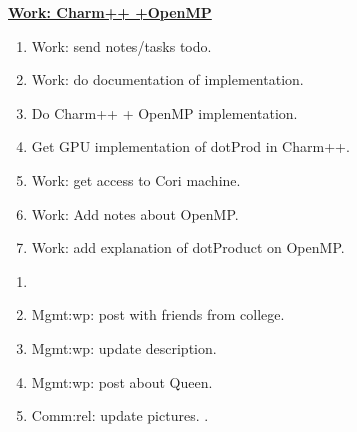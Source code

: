 \begin{multicols}{4}
\begin{minipage}{\columnwidth}
\underline{\bf \tiny {Work: Charm++ +OpenMP}}
\begin{enumerate}
\item \tiny Work: send notes/tasks todo.
\tiny \item \tiny Work: do documentation of implementation.
\item \tiny Do Charm++ + OpenMP implementation.
\item \tiny Get GPU implementation of dotProd in Charm++.
\item \tiny Work: get access to Cori machine.
\item \tiny Work: Add notes about OpenMP.
\item \tiny Work: add explanation of dotProduct on OpenMP.
\end{enumerate}
\end{minipage}

\begin{minipage}
\begin{enumerate} 
\tiny \item \tiny 
\item \tiny Mgmt:wp: post with friends from college. 
\item \tiny Mgmt:wp: update description. 
\item \tiny Mgmt:wp: post about Queen.   
\item \tiny Comm:rel: update pictures. .
\end{enumerate}
\end{minipage}


\end{multicols}
